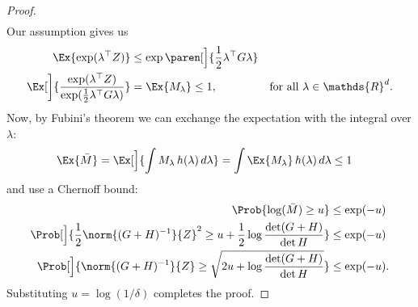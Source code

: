 \documentclass{article}
\newcommand{\inv}[1]{#1^{-1}}
\newcommand{\Real}{\mathds{R}}
\DeclarePairedDelimiter{\paren}()
\newcommand{\transp}[1]{#1^\top}
\begin{document}
\begin{lemma}
\begin{proof}
\begin{align*}
    \end{align*}
    Our assumption gives us
    \begin{align*}
      \Ex{\exp(\transp{\lambda}Z)} &\le \exp\paren[\Big]{\frac{1}{2}\transp{\lambda}G\lambda} \\
      \Ex[\bigg]{\frac{\exp(\transp{\lambda}Z)}{\exp(\frac{1}{2}\transp{\lambda}G\lambda)}}
      &= \Ex{M_\lambda} \le 1, &\text{for all }\lambda\in\Real^d.
    \end{align*}
    Now, by Fubini's theorem we can exchange the expectation with the
    integral over $\lambda$:
    \begin{align*}
      \Ex{\bar{M}} &= \Ex[\Big]{\int M_\lambda\,h(\lambda)\,d\lambda} = \int \Ex{M_\lambda} \,h(\lambda)\,d\lambda \le 1
    \end{align*}
    and use a Chernoff bound:
    \begin{align*}
      \Prob{\log(\bar{M}) \ge u} &\le \exp(-u) \\
      \Prob[\Big]{\frac{1}{2}\norm{\inv{(G+H)}}{Z}^2 \ge u + \frac{1}{2}\log\frac{\det(G+H)}{\det H}} &\le \exp(-u) \\
      \Prob[\Big]{\norm{\inv{(G+H)}}{Z} \ge \sqrt{2u + \log\frac{\det(G+H)}{\det H}}} &\le \exp(-u).
    \end{align*}
    Substituting $u = \log(1/\delta)$ completes the proof.
  \end{proof}

\end{lemma}

\end{document}
